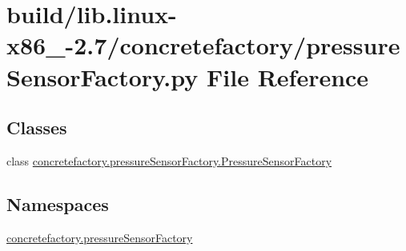 \hypertarget{build_2lib_8linux-x86__64-2_87_2concretefactory_2pressureSensorFactory_8py}{}\section{build/lib.linux-\/x86\+\_-\/2.7/concretefactory/pressure\+Sensor\+Factory.py File Reference}
\label{build_2lib_8linux-x86__64-2_87_2concretefactory_2pressureSensorFactory_8py}
\subsection*{Classes}
\begin{DoxyCompactItemize}
\item 
class \hyperlink{classconcretefactory_1_1pressureSensorFactory_1_1PressureSensorFactory}{concretefactory.\+pressure\+Sensor\+Factory.\+Pressure\+Sensor\+Factory}
\end{DoxyCompactItemize}
\subsection*{Namespaces}
\begin{DoxyCompactItemize}
\item 
 \hyperlink{namespaceconcretefactory_1_1pressureSensorFactory}{concretefactory.\+pressure\+Sensor\+Factory}
\end{DoxyCompactItemize}
